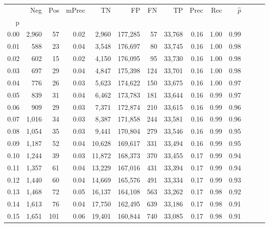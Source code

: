 \begin{tabular}{rrrrrrrrrrrrrr}
\toprule
{} &    Neg &  Pos & mPrec &       TN &       FP &      FN &      TP &  Prec &   Rec & $\hat{p}$ \\
p    &        &      &       &          &          &         &         &       &       &           \\
\midrule
0.00 &  2,960 &   57 &  0.02 &    2,960 &  177,285 &      57 &  33,768 &  0.16 &  1.00 &      0.99 \\
0.01 &    588 &   23 &  0.04 &    3,548 &  176,697 &      80 &  33,745 &  0.16 &  1.00 &      0.98 \\
0.02 &    602 &   15 &  0.02 &    4,150 &  176,095 &      95 &  33,730 &  0.16 &  1.00 &      0.98 \\
0.03 &    697 &   29 &  0.04 &    4,847 &  175,398 &     124 &  33,701 &  0.16 &  1.00 &      0.98 \\
0.04 &    776 &   26 &  0.03 &    5,623 &  174,622 &     150 &  33,675 &  0.16 &  1.00 &      0.97 \\
0.05 &    839 &   31 &  0.04 &    6,462 &  173,783 &     181 &  33,644 &  0.16 &  0.99 &      0.97 \\
0.06 &    909 &   29 &  0.03 &    7,371 &  172,874 &     210 &  33,615 &  0.16 &  0.99 &      0.96 \\
0.07 &  1,016 &   34 &  0.03 &    8,387 &  171,858 &     244 &  33,581 &  0.16 &  0.99 &      0.96 \\
0.08 &  1,054 &   35 &  0.03 &    9,441 &  170,804 &     279 &  33,546 &  0.16 &  0.99 &      0.95 \\
0.09 &  1,187 &   52 &  0.04 &   10,628 &  169,617 &     331 &  33,494 &  0.16 &  0.99 &      0.95 \\
0.10 &  1,244 &   39 &  0.03 &   11,872 &  168,373 &     370 &  33,455 &  0.17 &  0.99 &      0.94 \\
0.11 &  1,357 &   61 &  0.04 &   13,229 &  167,016 &     431 &  33,394 &  0.17 &  0.99 &      0.94 \\
0.12 &  1,440 &   60 &  0.04 &   14,669 &  165,576 &     491 &  33,334 &  0.17 &  0.99 &      0.93 \\
0.13 &  1,468 &   72 &  0.05 &   16,137 &  164,108 &     563 &  33,262 &  0.17 &  0.98 &      0.92 \\
0.14 &  1,613 &   76 &  0.04 &   17,750 &  162,495 &     639 &  33,186 &  0.17 &  0.98 &      0.91 \\
0.15 &  1,651 &  101 &  0.06 &   19,401 &  160,844 &     740 &  33,085 &  0.17 &  0.98 &      0.91 \\

\end{tabular}
